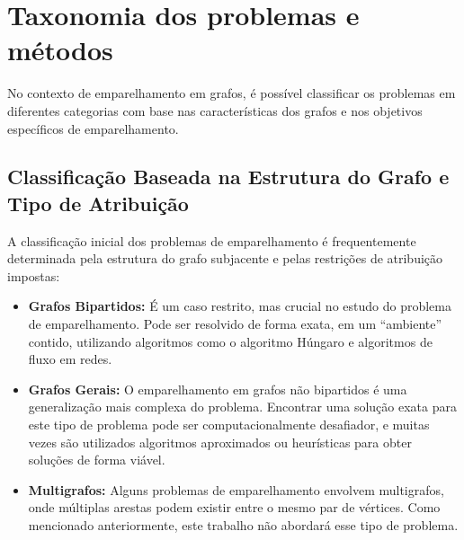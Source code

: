 

\chapter{Taxonomia dos problemas e métodos}

No contexto de emparelhamento em grafos, é possível classificar os problemas em diferentes categorias com base nas características dos grafos e nos objetivos específicos de emparelhamento. 

\section{Classificação Baseada na Estrutura do Grafo e Tipo de Atribuição}

A classificação inicial dos problemas de emparelhamento é frequentemente determinada pela estrutura do grafo subjacente e pelas 
restrições de atribuição impostas:

\begin{itemize}
    \item \textbf{Grafos Bipartidos: } É um caso restrito, mas crucial no estudo do problema de emparelhamento. Pode ser resolvido 
    de forma exata, em um ``ambiente'' contido, utilizando algoritmos como o algoritmo Húngaro e algoritmos de fluxo em redes.
    \cite{nips2006} \cite{lawler}
    \item \textbf{Grafos Gerais: } O emparelhamento em grafos não bipartidos é uma generalização mais complexa do problema. Encontrar uma solução exata para este tipo de problema pode ser computacionalmente desafiador, e muitas vezes são utilizados algoritmos aproximados ou heurísticas para obter soluções de forma viável.
    \item \textbf{Multigrafos: } Alguns problemas de emparelhamento envolvem multigrafos, onde múltiplas arestas podem existir entre 
    o mesmo par de vértices. Como mencionado anteriormente, este trabalho não abordará esse tipo de problema.
\end{itemize}